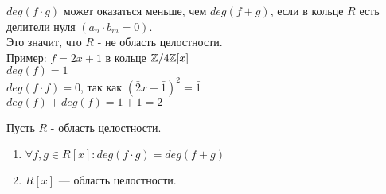 \notice
$deg(f\cdot g)$ может оказаться меньше, чем $deg(f + g)$, если в кольце $R$ есть делители нуля $(a_n\cdot b_m = 0)$. \\
Это значит, что $R$ - не область целостности. \\
Пример: $f = \bar{2}x + \bar{1}$ в кольце $\mathbb{Z} / 4\mathbb{Z}[x]$ \\
$deg(f) = 1$ \\
$deg(f\cdot f) = 0$, так как $(\bar{2}x + \bar{1})^2=\bar{1}$ \\
$deg(f) + deg(f)= 1 + 1 = 2$ \\

\begin{theorem-non}
    Пусть $R$ - область целостности.
    \begin{enumerate}
        \item $\forall f,g \in R[x]: deg(f\cdot g) = deg(f + g)$
        \item $R[x]$ --- область целостности.
    \end{enumerate}
\end{theorem-non}

